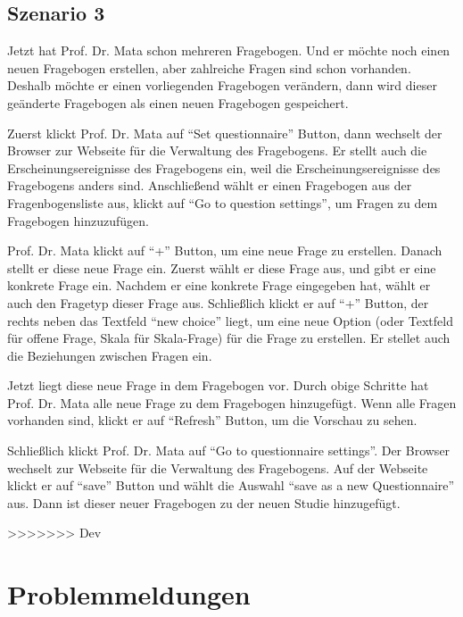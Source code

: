 \documentclass[a4paper]{scrreprt}
\begin{document}
            \section{Szenario 3}
                \par Jetzt hat Prof. Dr. Mata schon mehreren Fragebogen. Und er möchte noch einen neuen Fragebogen erstellen, aber zahlreiche Fragen sind schon vorhanden. Deshalb möchte er einen vorliegenden Fragebogen verändern, dann wird dieser geänderte Fragebogen als einen neuen Fragebogen gespeichert.

                \par Zuerst klickt Prof. Dr. Mata auf ``Set questionnaire'' Button, dann wechselt der Browser zur Webseite für die Verwaltung des Fragebogens. Er stellt auch die Erscheinungsereignisse des Fragebogens ein, weil die Erscheinungsereignisse des Fragebogens anders sind. Anschließend wählt er einen Fragebogen aus der Fragenbogensliste aus, klickt auf ``Go to question settings'', um Fragen zu dem Fragebogen hinzuzufügen.

                \par Prof. Dr. Mata klickt auf ``+'' Button, um eine neue Frage zu erstellen. Danach stellt er diese neue Frage ein. Zuerst wählt er diese Frage aus, und gibt er eine konkrete Frage ein. Nachdem er eine konkrete Frage eingegeben hat, wählt er auch den Fragetyp dieser Frage aus. Schließlich klickt er auf ``+'' Button, der rechts neben das Textfeld ``new choice'' liegt, um eine neue Option (oder Textfeld für offene Frage, Skala für Skala-Frage) für die Frage zu erstellen. Er stellet auch die Beziehungen zwischen Fragen ein.

                \par Jetzt liegt diese neue Frage in dem Fragebogen vor. Durch obige Schritte hat Prof. Dr. Mata alle neue Frage zu dem Fragebogen hinzugefügt. Wenn alle Fragen vorhanden sind, klickt er auf ``Refresh'' Button, um die Vorschau zu sehen.

                \par Schließlich klickt Prof. Dr. Mata auf ``Go to questionnaire settings''. Der Browser wechselt zur Webseite für die Verwaltung des Fragebogens. Auf der Webseite klickt er auf ``save'' Button und wählt die Auswahl ``save as a new Questionnaire'' aus. Dann ist dieser neuer Fragebogen zu der neuen Studie hinzugefügt.

	
	
>>>>>>> Dev


      \newpage
      \chapter{Problemmeldungen}
\end{document}
